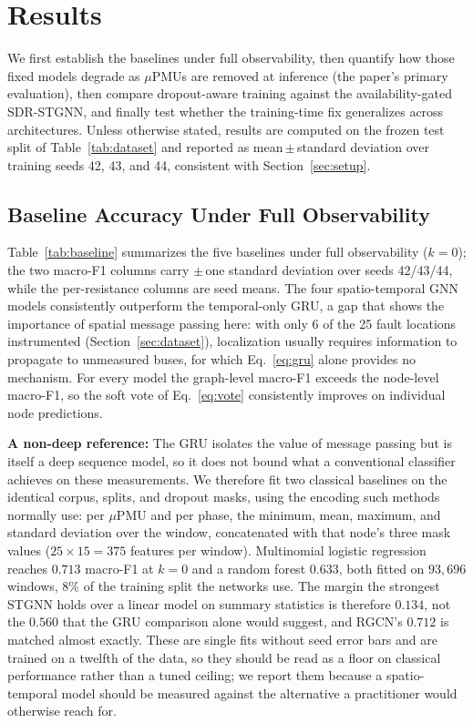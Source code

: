 \documentclass[3p,times,procedia]{elsarticle}
\begin{document}
\section{Results}
\label{sec:results}

We first establish the baselines under full observability, then quantify how those fixed models degrade as $\mu$PMUs are removed at inference (the paper's primary evaluation), then compare dropout-aware training against the availability-gated SDR-STGNN, and finally test whether the training-time fix generalizes across architectures. Unless otherwise stated, results are computed on the frozen test split of Table~\ref{tab:dataset} and reported as mean\,$\pm$\,standard deviation over training seeds 42, 43, and 44, consistent with Section~\ref{sec:setup}.

\subsection{Baseline Accuracy Under Full Observability}
\label{sec:res-baseline}

Table~\ref{tab:baseline} summarizes the five baselines under full observability ($k=0$); the two macro-F1 columns carry $\pm$\,one standard deviation over seeds 42/43/44, while the per-resistance columns are seed means. The four spatio-temporal GNN models consistently outperform the temporal-only GRU, a gap that shows the importance of spatial message passing here: with only 6 of the 25 fault locations instrumented (Section~\ref{sec:dataset}), localization usually requires information to propagate to unmeasured buses, for which Eq.~\eqref{eq:gru} alone provides no mechanism. For every model the graph-level macro-F1 exceeds the node-level macro-F1, so the soft vote of Eq.~\eqref{eq:vote} consistently improves on individual node predictions.

\textbf{A non-deep reference:} The GRU isolates the value of message passing but is itself a deep sequence model, so it does not bound what a conventional classifier achieves on these measurements. We therefore fit two classical baselines on the identical corpus, splits, and dropout masks, using the encoding such methods normally use: per $\mu$PMU and per phase, the minimum, mean, maximum, and standard deviation over the window, concatenated with that node's three mask values ($25\times15=375$ features per window). Multinomial logistic regression reaches $0.713$ macro-F1 at $k=0$ and a random forest $0.633$, both fitted on $93{,}696$ windows, $8\%$ of the training split the networks use. The margin the strongest STGNN holds over a linear model on summary statistics is therefore $0.134$, not the $0.560$ that the GRU comparison alone would suggest, and RGCN's $0.712$ is matched almost exactly. These are single fits without seed error bars and are trained on a twelfth of the data, so they should be read as a floor on classical performance rather than a tuned ceiling; we report them because a spatio-temporal model should be measured against the alternative a practitioner would otherwise reach for.
\end{document}
